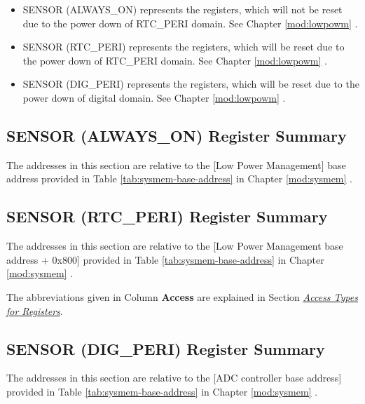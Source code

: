 \documentclass[main\_\_EN.tex]{subfiles}
\begin{document}
\begin{itemize}
   \item SENSOR (ALWAYS\_ON) represents the registers, which will not be reset due to the power down of RTC\_PERI domain. See Chapter \ref{mod:lowpowm} \textit{}.
    \item SENSOR (RTC\_PERI) represents the registers, which will be reset due to the power down of RTC\_PERI domain. See Chapter \ref{mod:lowpowm} \textit{}.
    \item SENSOR (DIG\_PERI) represents the registers, which will be reset due to the power down of digital domain. See Chapter \ref{mod:lowpowm} \textit{}.
\end{itemize}

\subsection{SENSOR (ALWAYS\_ON) Register Summary}

The addresses in this section are relative to the [Low Power Management] base address provided in Table \ref{tab:sysmem-base-address} in Chapter \ref{mod:sysmem} \textit{}.



\subsection{SENSOR (RTC\_PERI) Register Summary}

The addresses in this section are relative to the [Low Power Management base address + 0x{}800] provided in Table \ref{tab:sysmem-base-address} in Chapter \ref{mod:sysmem} \textit{}.

The abbreviations given in Column \textbf{Access} are explained in Section \hyperref[glossary-access-types]{\textit{Access Types for Registers}}.



\subsection{SENSOR (DIG\_PERI) Register Summary}

The addresses in this section are relative to the [ADC controller base address] provided in Table \ref{tab:sysmem-base-address} in Chapter \ref{mod:sysmem} \textit{}.
\end{document}
